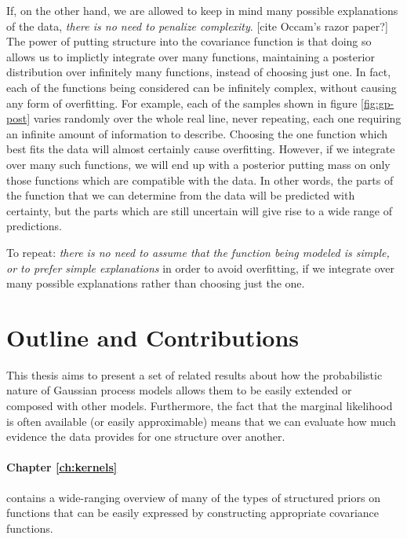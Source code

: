 If, on the other hand, we are allowed to keep in mind many possible explanations of the data, \emph{there is no need to penalize complexity}. [cite Occam's razor paper?]
The power of putting structure into the covariance function is that doing so allows us to implictly integrate over many functions, maintaining a posterior distribution over infinitely many functions, instead of choosing just one.
In fact, each of the functions being considered can be infinitely complex, without causing any form of overfitting.
For example, each of the samples shown in figure \ref{fig:gp-post} varies randomly over the whole real line, never repeating, each one requiring an infinite amount of information to describe.
Choosing the one function which best fits the data will almost certainly cause overfitting.
However, if we integrate over many such functions, we will end up with a posterior putting mass on only those functions which are compatible with the data.
In other words, the parts of the function that we can determine from the data will be predicted with certainty, but the parts which are still uncertain will give rise to a wide range of predictions.

To repeat: \emph{there is no need to assume that the function being modeled is simple, or to prefer simple explanations} in order to avoid overfitting, if we integrate over many possible explanations rather than choosing just the one.




\section{Outline and Contributions}

This thesis aims to present a set of related results about how the probabilistic nature of Gaussian process models allows them to be easily extended or composed with other models.
Furthermore, the fact that the marginal likelihood is often available (or easily approximable) means that we can evaluate how much evidence the data provides for one structure over another.


\paragraph{Chapter \ref{ch:kernels}} contains a wide-ranging overview of many of the types of structured priors on functions that can be easily expressed by constructing appropriate covariance functions.

